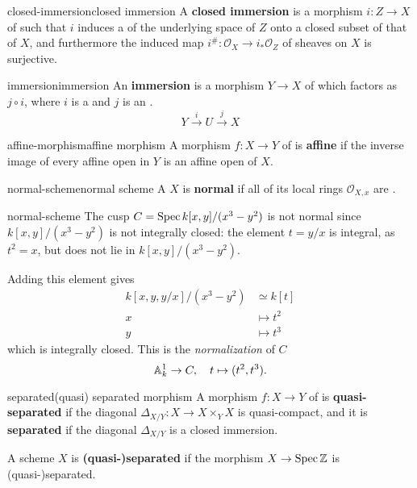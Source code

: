 \begin{topic}{closed-immersion}{closed immersion}
    A \textbf{closed immersion} is a morphism $i : Z \to X$ of  such that $i$ induces a  of the underlying space of $Z$ onto a closed subset of that of $X$, and furthermore the induced map $i^\# : \mathcal{O}_X \to i_*\mathcal{O}_Z$ of sheaves on $X$ is surjective.
\end{topic}

\begin{topic}{immersion}{immersion}
    An \textbf{immersion} is a morphism $Y \to X$ of  which factors as $j \circ i$, where $i$ is a  and $j$ is an .
    \[ Y \xrightarrow{i} U \xrightarrow{j} X \]
\end{topic}

\begin{topic}{affine-morphism}{affine morphism}
    A morphism $f : X \to Y$ of  is \textbf{affine} if the inverse image of every affine open in $Y$ is an affine open of $X$. 
\end{topic}

\begin{topic}{normal-scheme}{normal scheme}
    A  $X$ is \textbf{normal} if all of its local rings $\mathcal{O}_{X,x}$ are  .
\end{topic}

\begin{example}{normal-scheme}
    The cusp $C = \Spec k[x, y] / (x^3 - y^2)$ is not normal since $k[x, y] / (x^3 - y^2)$ is not integrally closed: the element $t = y/x$ is integral, as $t^2 = x$, but does not lie in $k[x, y] / (x^3 - y^2)$.
    
    Adding this element gives
    \[ \begin{aligned}
        k[x, y, y/x] / (x^3 - y^2) &\simeq k[t] \\
        x &\mapsto t^2 \\
        y &\mapsto t^3
    \end{aligned} \]
    which is integrally closed. This is the \textit{normalization} of $C$
    \[ \AA_k^1 \to C, \quad t \mapsto (t^2, t^3) . \]
\end{example}

\begin{topic}{separated}{(quasi) separated morphism}
    A morphism $f : X \to Y$ of  is \textbf{quasi-separated} if the diagonal $\Delta_{X/Y} : X \to X \times_Y X$ is quasi-compact, and it is \textbf{separated} if the diagonal $\Delta_{X/Y}$ is a closed immersion.
    
    A scheme $X$ is \textbf{(quasi-)separated} if the morphism $X \to \Spec \ZZ$ is (quasi-)separated.
\end{topic}

